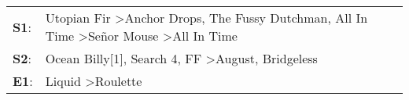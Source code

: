 \begin{supertabular}{p{0.03\textwidth}p{0.92\textwidth}}
 \textbf{S1}:  &  Utopian Fir\textsuperscript{} \textgreater \enspace Anchor Drops\textsuperscript{}, \enspace The Fussy Dutchman\textsuperscript{}, \enspace All In Time\textsuperscript{} \textgreater \enspace Señor Mouse\textsuperscript{} \textgreater \enspace All In Time\textsuperscript{}  \enspace  \\
 \textbf{S2}:  &                                                                                         Ocean Billy[1]\textsuperscript{}, \enspace Search 4\textsuperscript{}, \enspace FF\textsuperscript{} \textgreater \enspace August\textsuperscript{}, \enspace Bridgeless\textsuperscript{}  \enspace  \\
 \textbf{E1}:  &                                                                                                                                                                                                          Liquid\textsuperscript{} \textgreater \enspace Roulette\textsuperscript{}  \enspace  \\
\end{supertabular}
